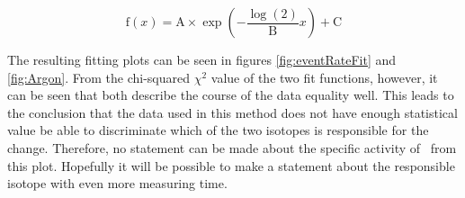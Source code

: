 \documentclass[encoding=utf8,british]{tumphthesis}
\begin{document}
\begin{equation}
\mathrm{f}(x) = \mathrm{A}\times\exp\left(-\frac{\log(2)}{\mathrm{B}} x \right) + \mathrm{C}
\label{equ:FitFun}
\end{equation}

The resulting fitting plots can be seen in figures \ref{fig:eventRateFit} and \ref{fig:Argon}.
From the chi-squared $\chi^2$ value  of the two fit functions, however, it can be seen that both describe the course of the data equality well.
This leads to the conclusion that the data used in this method does not have enough statistical value be able to discriminate  which of the two isotopes is responsible for the change.
Therefore, no statement can be made about the specific activity of \Kr\ from this plot.
Hopefully it will be possible to make a statement about the responsible isotope with even more measuring time.
\\
\end{document}
